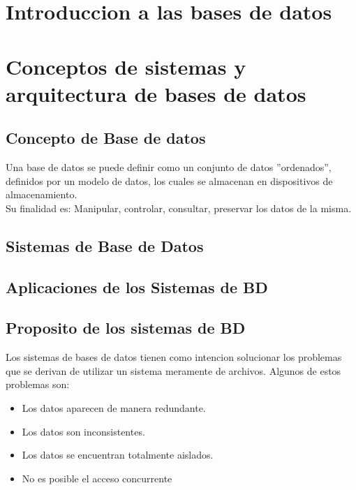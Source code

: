 \documentclass[twoside]{article}
\begin{document}
\null
\thispagestyle{empty}
\newpage
{}
\selectfont
\tableofcontents
\newpage
\cleardoublepage
\section{Introduccion a las bases de datos}

\section{Conceptos de sistemas y arquitectura de bases de datos}

\subsection{Concepto de Base de datos}

Una base de datos se puede definir como un conjunto de datos ''ordenados'', definidos por un modelo de datos, los cuales se almacenan en dispositivos de almacenamiento.\\

Su finalidad es: Manipular, controlar, consultar, preservar los datos de la misma.

\subsection{Sistemas de Base de Datos} %
\subsection{Aplicaciones de los Sistemas de BD}

\subsection{Proposito de los sistemas de BD}

Los sistemas de bases de datos tienen como intencion solucionar los problemas que se derivan de utilizar un sistema meramente de archivos.
Algunos de estos problemas son:

\begin{itemize}
  \item Los datos aparecen de manera redundante.
  \item Los datos son inconsistentes.
  \item Los datos se encuentran totalmente aislados.
  \item No es posible el acceso concurrente
\end{itemize}
\end{document}
